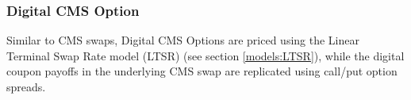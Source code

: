 \subsubsection{Digital CMS Option}
\label{pricing:ir_digitalcms}

Similar to CMS swaps, Digital CMS Options are priced using the Linear Terminal
Swap Rate model (LTSR) (see section \ref{models:LTSR}), while the digital coupon
payoffs in the underlying CMS swap are replicated using call/put option spreads.